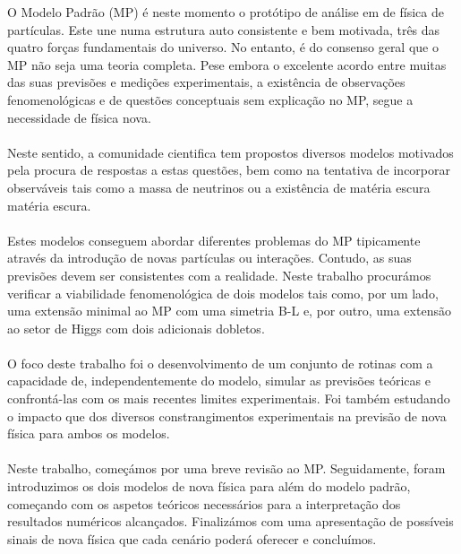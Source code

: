 \documentclass[10pt]{book}
\renewcommand{\(}{\left(}
\renewcommand{\)}{\right)}
\renewcommand{\[}{\left[}
\renewcommand{\]}{\right]}
\begin{document}
\TitlePage
  \vspace*{55mm}
       {O Modelo Padrão (MP) é neste momento o protótipo de análise em de física de partículas. 
       	Este une numa estrutura auto consistente e bem motivada, três das quatro forças fundamentais do universo. 
       	No entanto, é do consenso geral que o MP não seja uma teoria completa. 
       	Pese embora o excelente acordo entre muitas das suas previsões e medições experimentais, a existência de observações fenomenológicas e de questões conceptuais sem explicação no MP, segue a necessidade de física nova. 
       	\\ \ \\ 
       	Neste sentido, a comunidade cientifica tem propostos diversos modelos motivados pela procura de respostas a estas questões, bem como na tentativa de incorporar observáveis tais como a massa de neutrinos ou a existência de matéria escura matéria escura.
       	\\ \ \\ 
       	Estes modelos conseguem abordar diferentes problemas do MP tipicamente através da introdução de novas partículas ou interações. 
       	Contudo, as suas previsões devem ser consistentes com a realidade. 
       	Neste trabalho procurámos verificar a viabilidade fenomenológica de dois modelos tais como, por um lado, uma extensão minimal ao MP com uma simetria B-L e, por outro, uma extensão ao setor de Higgs com dois adicionais dobletos.
       	\\ \ \\
       	O foco deste trabalho foi o desenvolvimento de um conjunto de rotinas com a capacidade de, independentemente do modelo, simular as previsões teóricas e confrontá-las com os mais recentes limites experimentais.
       	Foi também estudando o impacto que dos diversos constrangimentos experimentais na previsão de nova física para ambos os modelos.
       	\\ \ \\                                                                                                                                                                                                                                                                                                                                                                
       	Neste trabalho, começámos por uma breve revisão ao MP. Seguidamente, foram introduzimos os dois modelos de nova física para além do modelo padrão, começando com os aspetos teóricos necessários para a interpretação dos resultados numéricos alcançados. Finalizámos com uma apresentação de possíveis sinais de nova física que cada cenário poderá oferecer e concluímos.
       }
\EndTitlePage
\titlepage\ \endtitlepage %
\end{document}
